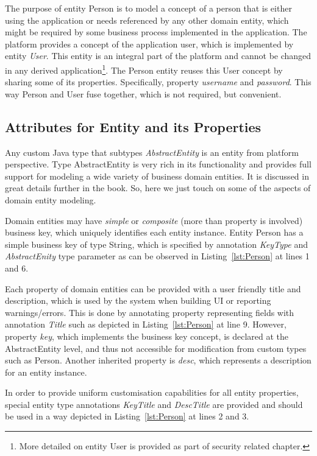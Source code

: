   The purpose of entity Person is to model a concept of a person that is either using the application or needs referenced by any other domain entity, which might be required by some business process implemented in the application.
  The platform provides a concept of the application user, which is implemented by entity \emph{User}.
  This entity is an integral part of the platform and cannot be changed in any derived application\footnote{More detailed on entity User is provided as part of security related chapter.}.
  The Person entity reuses this User concept by sharing some of its properties.
  Specifically, property \emph{username} and \emph{password}.
  This way Person and User fuse together, which is not required, but convenient.  

\subsection{Attributes for Entity and its Properties}
  Any custom Java type that subtypes \emph{AbstractEntity} is an entity from platform perspective.
  Type AbstractEntity is very rich in its functionality and provides full support for modeling a wide variety of business domain entities.
  It is discussed in great details further in the book.
  So, here we just touch on some of the aspects of domain entity modeling.

  Domain entities may have \emph{simple} or \emph{composite} (more than property is involved) business key, which uniquely identifies each entity instance.
  Entity Person has a simple business key of type String, which is specified by annotation \emph{KeyType}  and \emph{AbstractEnity} type parameter as can be observed in Listing~\ref{lst:Person} at lines 1 and 6.
  
  Each property of domain entities can be provided with a user friendly title and description, which is used by the system when building UI or reporting warnings/errors.
  This is done by annotating property representing fields with annotation \emph{Title} such as depicted in Listing~\ref{lst:Person} at line 9.
  However, property \emph{key}, which implements the business key concept, is declared at the AbstractEntity level, and thus not accessible for modification from custom types such as Person.
  Another inherited property is \emph{desc}, which represents a description for an entity instance.
  
  In order to provide uniform customisation capabilities for all entity properties, special entity type annotations \emph{KeyTitle} and \emph{DescTitle} are provided and should be used in a way depicted in Listing~\ref{lst:Person} at lines 2 and 3.
  
